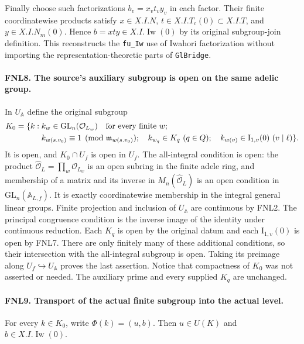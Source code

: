 Finally choose such factorizations \(b_v=x_vt_vy_v\) in each factor.
Their finite coordinatewise products satisfy
\(x\in X.I.N\), \(t\in X.I.T_c(0)\subset X.I.T\), and
\(y\in X.I.N_m(0)\).  Hence \(b=xty\in X.I.\operatorname{Iw}(0)\)
by its original subgroup-join definition.  This reconstructs the
\texttt{fu\_Iw} use of Iwahori factorization without importing the
representation-theoretic parts of \texttt{GlBridge}.

\paragraph{FNL8. The source's auxiliary subgroup is open on the same adelic group.}
\label{claim:FNL8}
In \(U_{\mathbb A}\) define the original subgroup
\[
 \begin{split}
 K_0=\{k:\;& k_w\in\mathrm{GL}_n(\mathcal O_{L_w})
                          \quad\hbox{for every finite }w;\\
 &k_{w(s.v_0)}\equiv1\pmod{\mathfrak m_{w(s.v_0)}};\quad
 k_{w_q}\in K_q\ (q\in Q);\quad
 k_{w(v)}\in\mathrm I_{1,v}(0)\ (v\mid\ell)\}.
 \end{split}
\]
It is open, and \(K_0\cap U_f\) is open in \(U_f\).
The all-integral condition is open: the product
\(\widehat{\mathcal O}_L=\prod_w\mathcal O_{L_w}\) is an open
subring in the finite adele ring, and membership of a matrix and its
inverse in \(M_n(\widehat{\mathcal O}_L)\) is an open condition in
\(\mathrm{GL}_n(\mathbb A_{L,f})\).  It is exactly coordinatewise
membership in the integral general linear groups.  Finite projection
and inclusion of \(U_{\mathbb A}\) are continuous by FNL2.
The principal congruence condition is the inverse image of the
identity under continuous reduction.  Each \(K_q\) is open by the
original datum and each \(\mathrm I_{1,v}(0)\) is open by FNL7.
There are only finitely many of these additional conditions, so their
intersection with the all-integral subgroup is open.  Taking its
preimage along \(U_f\hookrightarrow U_{\mathbb A}\) proves the last
assertion.  Notice that compactness of \(K_0\) was not asserted or
needed.  The auxiliary prime and every supplied \(K_q\) are unchanged.

\paragraph{FNL9. Transport of the actual finite subgroup into the actual level.}
\label{claim:FNL9}
For every \(k\in K_0\), write \(\Phi(k)=(u,b)\).  Then
\(u\in U(K)\) and \(b\in X.I.\operatorname{Iw}(0)\).

